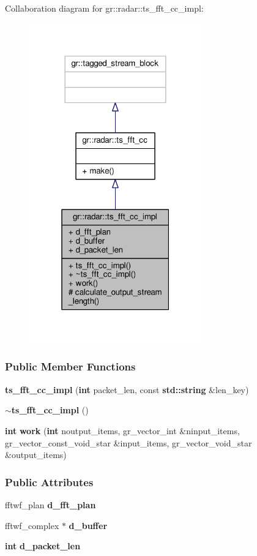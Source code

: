 Collaboration diagram for gr\+:\+:radar\+:\+:ts\+\_\+fft\+\_\+cc\+\_\+impl\+:
\nopagebreak
\begin{figure}[H]
\begin{center}
\leavevmode
\includegraphics[width=211pt]{d9/d3b/classgr_1_1radar_1_1ts__fft__cc__impl__coll__graph}
\end{center}
\end{figure}
\subsubsection*{Public Member Functions}
\begin{DoxyCompactItemize}
\item 
{\bf ts\+\_\+fft\+\_\+cc\+\_\+impl} ({\bf int} packet\+\_\+len, const {\bf std\+::string} \&len\+\_\+key)
\item 
{\bf $\sim$ts\+\_\+fft\+\_\+cc\+\_\+impl} ()
\item 
{\bf int} {\bf work} ({\bf int} noutput\+\_\+items, gr\+\_\+vector\+\_\+int \&ninput\+\_\+items, gr\+\_\+vector\+\_\+const\+\_\+void\+\_\+star \&input\+\_\+items, gr\+\_\+vector\+\_\+void\+\_\+star \&output\+\_\+items)
\end{DoxyCompactItemize}
\subsubsection*{Public Attributes}
\begin{DoxyCompactItemize}
\item 
fftwf\+\_\+plan {\bf d\+\_\+fft\+\_\+plan}
\item 
fftwf\+\_\+complex $\ast$ {\bf d\+\_\+buffer}
\item 
{\bf int} {\bf d\+\_\+packet\+\_\+len}
\end{DoxyCompactItemize}

